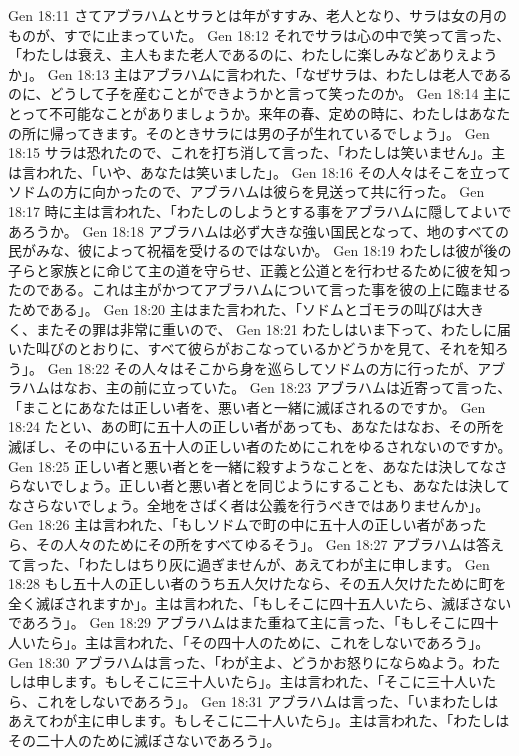 Gen 18:11  さてアブラハムとサラとは年がすすみ、老人となり、サラは女の月のものが、すでに止まっていた。
Gen 18:12  それでサラは心の中で笑って言った、「わたしは衰え、主人もまた老人であるのに、わたしに楽しみなどありえようか」。
Gen 18:13  主はアブラハムに言われた、「なぜサラは、わたしは老人であるのに、どうして子を産むことができようかと言って笑ったのか。
Gen 18:14  主にとって不可能なことがありましょうか。来年の春、定めの時に、わたしはあなたの所に帰ってきます。そのときサラには男の子が生れているでしょう」。
Gen 18:15  サラは恐れたので、これを打ち消して言った、「わたしは笑いません」。主は言われた、「いや、あなたは笑いました」。
Gen 18:16  その人々はそこを立ってソドムの方に向かったので、アブラハムは彼らを見送って共に行った。
Gen 18:17  時に主は言われた、「わたしのしようとする事をアブラハムに隠してよいであろうか。
Gen 18:18  アブラハムは必ず大きな強い国民となって、地のすべての民がみな、彼によって祝福を受けるのではないか。
Gen 18:19  わたしは彼が後の子らと家族とに命じて主の道を守らせ、正義と公道とを行わせるために彼を知ったのである。これは主がかつてアブラハムについて言った事を彼の上に臨ませるためである」。
Gen 18:20  主はまた言われた、「ソドムとゴモラの叫びは大きく、またその罪は非常に重いので、
Gen 18:21  わたしはいま下って、わたしに届いた叫びのとおりに、すべて彼らがおこなっているかどうかを見て、それを知ろう」。
Gen 18:22  その人々はそこから身を巡らしてソドムの方に行ったが、アブラハムはなお、主の前に立っていた。
Gen 18:23  アブラハムは近寄って言った、「まことにあなたは正しい者を、悪い者と一緒に滅ぼされるのですか。
Gen 18:24  たとい、あの町に五十人の正しい者があっても、あなたはなお、その所を滅ぼし、その中にいる五十人の正しい者のためにこれをゆるされないのですか。
Gen 18:25  正しい者と悪い者とを一緒に殺すようなことを、あなたは決してなさらないでしょう。正しい者と悪い者とを同じようにすることも、あなたは決してなさらないでしょう。全地をさばく者は公義を行うべきではありませんか」。
Gen 18:26  主は言われた、「もしソドムで町の中に五十人の正しい者があったら、その人々のためにその所をすべてゆるそう」。
Gen 18:27  アブラハムは答えて言った、「わたしはちり灰に過ぎませんが、あえてわが主に申します。
Gen 18:28  もし五十人の正しい者のうち五人欠けたなら、その五人欠けたために町を全く滅ぼされますか」。主は言われた、「もしそこに四十五人いたら、滅ぼさないであろう」。
Gen 18:29  アブラハムはまた重ねて主に言った、「もしそこに四十人いたら」。主は言われた、「その四十人のために、これをしないであろう」。
Gen 18:30  アブラハムは言った、「わが主よ、どうかお怒りにならぬよう。わたしは申します。もしそこに三十人いたら」。主は言われた、「そこに三十人いたら、これをしないであろう」。
Gen 18:31  アブラハムは言った、「いまわたしはあえてわが主に申します。もしそこに二十人いたら」。主は言われた、「わたしはその二十人のために滅ぼさないであろう」。
